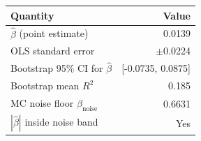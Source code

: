 \begin{tabular}{lr}
\toprule
Quantity & Value \\
\midrule
$\hat\beta$ (point estimate) & 0.0139 \\
OLS standard error & $\pm$0.0224 \\
Bootstrap 95\% CI for $\hat\beta$ & [-0.0735, 0.0875] \\
Bootstrap mean $R^2$ & 0.185 \\
MC noise floor $\beta_{\mathrm{noise}}$ & 0.6631 \\
$|\hat\beta|$ inside noise band & Yes \\
\bottomrule
\end{tabular}